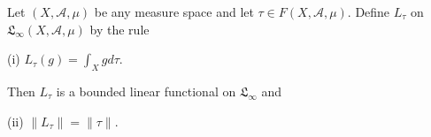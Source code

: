 Let $(X, \mathcal{A}, \mu)$ be any measure space and let $\tau \in F(X, \mathcal{A}, \mu)$. Define $L_{\tau}$ on $\mathfrak{L}_{\infty}(X, \mathcal{A}, \mu)$ by the rule

(i) $L_{\tau}(g) = \int_X g d\tau$.

Then $L_{\tau}$ is a bounded linear functional on $\mathfrak{L}_{\infty}$ and

(ii) $\|L_{\tau}\| = \|\tau\|$.